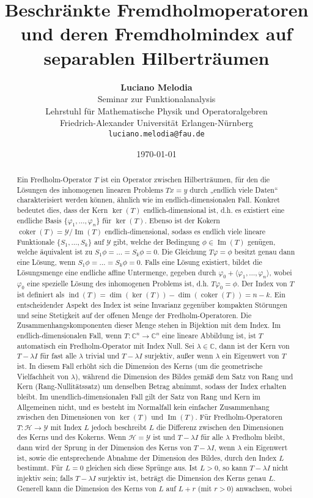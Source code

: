 \documentclass[11pt, hidelinks]{article}
\title{\textbf{Beschränkte Fremdholmoperatoren und deren Fremdholmindex auf separablen Hilberträumen}}
\author{
\textbf{Luciano Melodia} \\
Seminar zur Funktionalanalysis \\
Lehrstuhl für Mathematische Physik und Operatoralgebren \\
Friedrich-Alexander Universität Erlangen-Nürnberg \\
\texttt{luciano.melodia@fau.de}}
\date{\today}
\numberwithin{conj}{section}
\begin{document}
\hypersetup{bookmarksnumbered=true}
\maketitle

\begin{abstract}
Ein Fredholm-Operator \(T\) ist ein Operator zwischen Hilberträumen, für den die Lösungen des inhomogenen linearen Problems \(T x = y\) durch „endlich viele Daten“ charakterisiert werden können, ähnlich wie im endlich-dimensionalen Fall. Konkret bedeutet dies, dass der Kern \(\ker(T)\) endlich-dimensional ist, d.h. es existiert eine endliche Basis \(\{\varphi_1, \dots, \varphi_n\}\) für \(\ker(T)\). Ebenso ist der Kokern \(\operatorname{coker}(T) = \mathcal{Y} / \operatorname{Im}(T)\) endlich-dimensional, sodass es endlich viele lineare Funktionale \(\{S_1, \dots, S_k\}\) auf \(\mathcal{Y}\) gibt, welche der Bedingung \(\phi \in \operatorname{Im}(T)\) genügen, welche äquivalent ist zu \(S_1 \phi = \dots = S_k \phi  = 0\). Die Gleichung \(T \varphi = \phi\) besitzt genau dann eine Lösung, wenn \(S_1 \phi = \dots = S_k \phi = 0\). Falls eine Lösung existiert, bildet die Lösungsmenge eine endliche affine Untermenge, gegeben durch \(\varphi_0 + \langle \varphi_1, \dots, \varphi_n \rangle\), wobei \(\varphi_0\) eine spezielle Lösung des inhomogenen Problems ist, d.h. \(T \varphi_0 = \phi\). Der Index von \(T\) ist definiert als \(\operatorname{ind}(T) = \dim(\ker(T)) - \dim(\operatorname{coker}(T)) = n - k\). Ein entscheidender Aspekt des Index ist seine Invarianz gegenüber kompakten Störungen und seine Stetigkeit auf der offenen Menge der Fredholm-Operatoren. Die Zusammenhangskomponenten dieser Menge stehen in Bijektion mit dem Index. Im endlich-dimensionalen Fall, wenn \(T: \mathbb{C}^n \to \mathbb{C}^n\) eine lineare Abbildung ist, ist \(T\) automatisch ein Fredholm-Operator mit Index Null. Sei \(\lambda \in \mathbb{C}\), dann ist der Kern von \(T - \lambda I\) für fast alle \(\lambda\) trivial und \(T - \lambda I\) surjektiv, außer wenn \(\lambda\) ein Eigenwert von \(T\) ist. In diesem Fall erhöht sich die Dimension des Kerns (um die geometrische Vielfachheit von \(\lambda\)), während die Dimension des Bildes gemäß dem Satz von Rang und Kern (Rang-Nullitätssatz) um denselben Betrag abnimmt, sodass der Index erhalten bleibt. Im unendlich-dimensionalen Fall gilt der Satz von Rang und Kern im Allgemeinen nicht, und es besteht im Normalfall kein einfacher Zusammenhang zwischen den Dimensionen von \(\ker(T)\) und \(\operatorname{Im}(T)\). Für Fredholm-Operatoren \(T: \mathcal{H} \to \mathcal{Y}\) mit Index \(L\) jedoch beschreibt \(L\) die Differenz zwischen den Dimensionen des Kerns und des Kokerns. Wenn \(\mathcal{H} = \mathcal{Y}\) ist und \(T - \lambda I\) für alle \(\lambda\) Fredholm bleibt, dann wird der Sprung in der Dimension des Kerns von \(T - \lambda I\), wenn \(\lambda\) ein Eigenwert ist, sowie die entsprechende Abnahme der Dimension des Bildes, durch den Index \(L\) bestimmt. Für \(L = 0\) gleichen sich diese Sprünge aus. Ist \(L > 0\), so kann \(T - \lambda I\) nicht injektiv sein; falls \(T - \lambda I\) surjektiv ist, beträgt die Dimension des Kerns genau \(L\). Generell kann die Dimension des Kerns von \(L\) auf \(L + r\) (mit \(r > 0\)) anwachsen, wobei 
\end{abstract}
\end{document}
